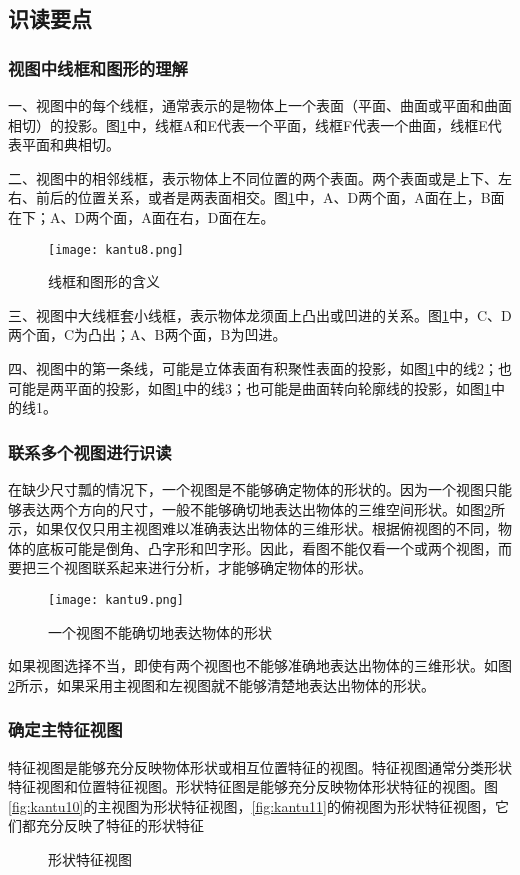 \subsection{识读要点}
\subsubsection{视图中线框和图形的理解}
一、视图中的每个线框，通常表示的是物体上一个表面（平面、曲面或平面和曲面相切）的投影。图\ref{fig:kantu8}中，线框A和E代表一个平面，线框F代表一个曲面，线框E代表平面和典相切。

二、视图中的相邻线框，表示物体上不同位置的两个表面。两个表面或是上下、左右、前后的位置关系，或者是两表面相交。图\ref{fig:kantu8}中，A、D两个面，A面在上，B面在下；A、D两个面，A面在右，D面在左。

\begin{figure}[htbp]
\centering
\texttt{[image: kantu8.png]}
\caption{线框和图形的含义}\label{fig:kantu8}
\end{figure}


三、视图中大线框套小线框，表示物体龙须面上凸出或凹进的关系。图\ref{fig:kantu8}中，C、D两个面，C为凸出；A、B两个面，B为凹进。

四、视图中的第一条线，可能是立体表面有积聚性表面的投影，如图\ref{fig:kantu8}中的线2；也可能是两平面的投影，如图\ref{fig:kantu8}中的线3；也可能是曲面转向轮廓线的投影，如图\ref{fig:kantu8}中的线1。
\subsubsection{联系多个视图进行识读}
在缺少尺寸瓢的情况下，一个视图是不能够确定物体的形状的。因为一个视图只能够表达两个方向的尺寸，一般不能够确切地表达出物体的三维空间形状。如图\ref{fig:kantu9}所示，如果仅仅只用主视图难以准确表达出物体的三维形状。根据俯视图的不同，物体的底板可能是倒角、凸字形和凹字形。因此，看图不能仅看一个或两个视图，而要把三个视图联系起来进行分析，才能够确定物体的形状。

\begin{figure}[htbp]
\centering
\texttt{[image: kantu9.png]}
\caption{一个视图不能确切地表达物体的形状}\label{fig:kantu9}
\end{figure}

如果视图选择不当，即使有两个视图也不能够准确地表达出物体的三维形状。如图\ref{fig:kantu9}所示，如果采用主视图和左视图就不能够清楚地表达出物体的形状。


\subsubsection{确定主特征视图}
特征视图是能够充分反映物体形状或相互位置特征的视图。特征视图通常分类形状特征视图和位置特征视图。形状特征图是能够充分反映物体形状特征的视图。图\ref{fig:kantu10}的主视图为形状特征视图，\ref{fig:kantu11}的俯视图为形状特征视图，它们都充分反映了特征的形状特征
\begin{figure}[htbp]
\centering
{}\hspace{30pt}
\caption{形状特征视图}
\end{figure}

